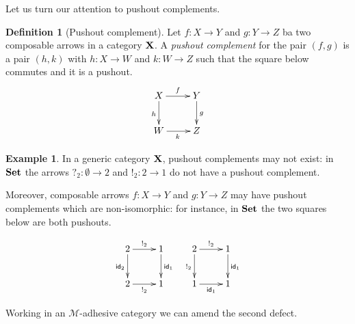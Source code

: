 \documentclass[a4paper]{article}
\newcommand{\id}[1]{\mathsf{id}_{#1}}
\def\X{\textbf {\textup{X}}}
\def\Set{\textbf {\textup{Set}}}
\theoremstyle{definition}
\newtheorem{definition}[theorem]{Definition}
\newtheorem{example}[theorem]{Example}
\begin{document}
Let us turn our attention to pushout complements.

\begin{definition}[Pushout complement]
Let $f\colon X\to Y$ and $g\colon Y\to Z$ ba two composable arrows in a category $\X$. A \emph{pushout complement} for the pair $(f,g)$ is a pair $(h,k)$ with $h\colon X\to W$ and $k\colon W\to Z$ such that the square below commutes and it is a pushout.
\[\xymatrix{X \ar[r]^{f} \ar[d]_{h}& Y \ar[d]^{g} \\ W \ar[r]_{k}& Z}\]
\end{definition}

\begin{example}
	In a generic category $\X$, pushout complements may not exist: in $\Set$ the arrows $?_{2}\colon \emptyset \to 2$ and $!_2\colon 2\to 1$ do not have a pushout complement.
	
	Moreover, composable arrows $f\colon X\to Y$ and $g\colon Y\to Z$ may have  pushout complements which are non-isomorphic: for instance, in $\Set$ the two squares below are both pushouts.
	
	\[\xymatrix{2 \ar[r]^{!_2} \ar[d]_{\id{2}}& 1 \ar[d]^{\id{1}} & 2 \ar[r]^{!_2} \ar[d]_{!_2}& 1 \ar[d]^{\id{1}}\\ 2 \ar[r]_{!_2}& 1 & 1 \ar[r]_{\id{1}}& 1}\]
\end{example}

Working in an $\mathcal{M}$-adhesive category we can amend the second defect. 
\end{document}
